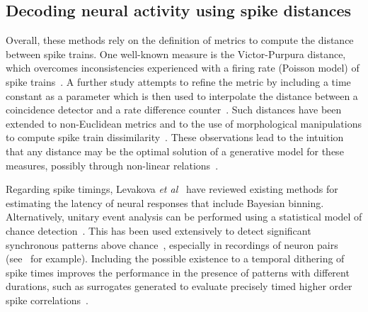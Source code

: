 \documentclass[runningheads]{llncs}
\begin{document}
\subsection{Decoding neural activity using spike distances}
%
Overall, these methods rely on the definition of metrics to compute the distance between spike trains.
One well-known measure is the Victor-Purpura distance, which overcomes inconsistencies experienced with a firing rate (Poisson model) of spike trains~\cite{victor_nature_1996}.
% 
A further study attempts to refine the metric by including a time constant as a parameter which is then used to interpolate the distance between a coincidence detector and a rate difference counter~\cite{van_rossum_novel_2001}. Such distances have been extended to non-Euclidean metrics and to the use of morphological manipulations to compute spike train dissimilarity~\cite{kreuz_measuring_2007}. These observations lead to the intuition that any distance may be the optimal solution of a generative model for these measures, possibly through non-linear relations~\cite{aronov_non-euclidean_2004}. 

Regarding spike timings, Levakova {\it et al}~\cite{levakova_review_2015} have reviewed existing methods for estimating the latency of neural responses that include Bayesian binning. Alternatively, unitary event analysis can be performed using a statistical model of chance detection~\cite{grun_unitary_2002-1}. This has been used extensively to detect significant synchronous patterns above chance~\cite{grun_unitary_2010}, especially in recordings of neuron pairs (see~\cite{riehle_spike_1997} for example). %
Including the possible existence to a temporal dithering of spike times improves the performance in the presence of patterns with different durations, such as surrogates generated to evaluate precisely timed higher order spike correlations~\cite{stella_comparing_2022}. %
%
\end{document}
